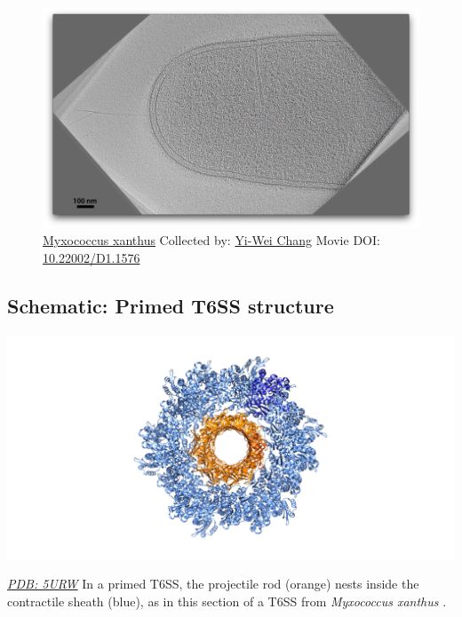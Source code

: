 \documentclass[]{tufte-book}
\begin{document}
\begin{figure}
\includegraphics{movie_stills/9_6} \caption[\protect\hyperlink{tree}{Myxococcus xanthus} Collected by:
\protect\hyperlink{yi-wei_chang}{Yi-Wei Chang} Movie DOI:
\href{https://doi.org/10.22002/D1.1576}{10.22002/D1.1576}]{\protect\hyperlink{tree}{Myxococcus xanthus} Collected by:
\protect\hyperlink{yi-wei_chang}{Yi-Wei Chang} Movie DOI:
\href{https://doi.org/10.22002/D1.1576}{10.22002/D1.1576}}\label{fig:9-6}
\end{figure}

\hypertarget{Primed_T6SS_structure}{\subsection*{Schematic: Primed T6SS
structure}\label{Primed_T6SS_structure}}

\includegraphics{img/schematics/9_6_1}

\href{http://rcsb.org/structure/5URW}{\emph{PDB: 5URW}} In a primed
T6SS, the projectile rod (orange) nests inside the contractile sheath
(blue), as in this section of a T6SS from \emph{Myxococcus xanthus}
\citep{chang2017}.
\end{document}
